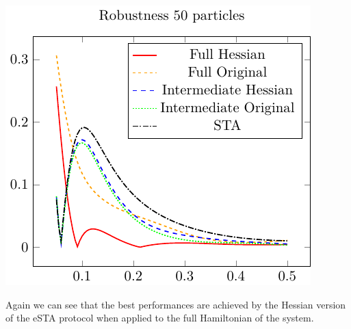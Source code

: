 \centering
\includegraphics{./gfx/robustness_np50_nlambda5.pdf}

Again we can see that the best performances are achieved by the Hessian version of the eSTA protocol when applied to the full Hamiltonian of the system.

